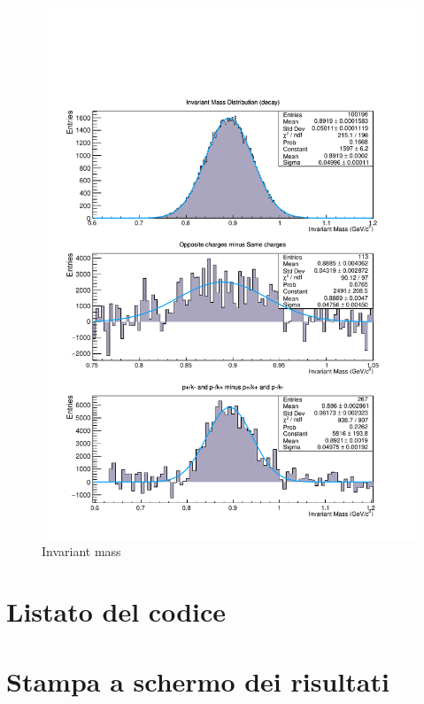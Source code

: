 \documentclass{article}
\begin{document}
\begin{figure}[ht]
    \centering
    \includegraphics[height = 0.9\textheight]{InvMass.pdf}
    \caption{Invariant mass}
    \label{fig:InvMass}
\end{figure}
\section{Listato del codice}
\label{Listato del codice}
\section{Stampa a schermo dei risultati}
\label{Stampa a schermo dei risultati}
\end{document}
